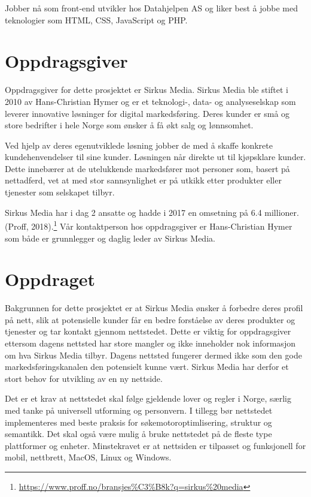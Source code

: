Jobber nå som front-end utvikler hos Datahjelpen AS og liker best å jobbe med teknologier som HTML, CSS, JavaScript og PHP.

\section{Oppdragsgiver}
Oppdragsgiver for dette prosjektet er Sirkus Media.
Sirkus Media ble stiftet i 2010 av Hans-Christian Hymer og er et teknologi-, data- og analyseselskap som leverer innovative løsninger for digital markedsføring. Deres kunder er små og store bedrifter i hele Norge som ønsker å få økt salg og lønnsomhet. 

Ved hjelp av deres egenutviklede løsning jobber de med å skaffe konkrete kundehenvendelser til sine kunder. Løsningen når direkte ut til kjøpsklare kunder. Dette innebærer at de utelukkende markedsfører mot personer som, basert på nettadferd, vet at med stor sannsynlighet er på utkikk etter produkter eller tjenester som selskapet tilbyr.

Sirkus Media har i dag 2 ansatte og hadde i 2017 en omsetning på 6.4 millioner. (Proff, 2018).\footnote{\url{https://www.proff.no/bransjes\%C3\%B8k?q=sirkus\%20media}}
Vår kontaktperson hos oppdragsgiver er Hans-Christian Hymer som både er grunnlegger og daglig leder av Sirkus Media. 

\section{Oppdraget}
\label{sec:oppgaven}
Bakgrunnen for dette prosjektet er at Sirkus Media ønsker å forbedre deres profil på nett, slik at potensielle kunder får en bedre forståelse av deres produkter og tjenester og tar kontakt gjennom nettstedet. Dette er viktig for oppdragsgiver ettersom dagens nettsted har store mangler og ikke inneholder nok informasjon om hva Sirkus Media tilbyr. Dagens nettsted fungerer dermed ikke som den gode markedsføringskanalen den potensielt kunne vært. Sirkus Media har derfor et stort behov for utvikling av en ny nettside. 

Det er et krav at nettstedet skal følge gjeldende lover og regler i Norge, særlig med tanke på universell utforming og personvern. I tillegg bør nettstedet implementeres med beste praksis for søkemotoroptimlisering, struktur og semantikk. Det skal også være mulig å bruke nettstedet på de fleste type plattformer og enheter. Minstekravet er at nettsiden er tilpasset og funksjonell for mobil, nettbrett, MacOS, Linux og Windows.

